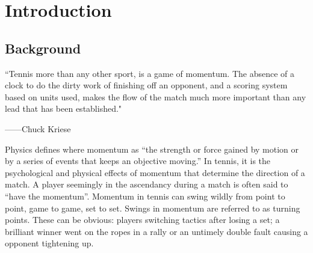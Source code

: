 \documentclass{mcmthesis}
\begin{document}
\begin{abstract}
     {\bf Finally}, we applied the model to data from other games to test the model's ability to
    generalize. Although the model performed poorly in some cases, this prompted us to identify and
    suggest additional factors that may need to be included in future models, such as the {\bf physical
    condition of the players, weather conditions}, as well as {\bf psychological stress}. \par
    Through this study, we have provided coaches and players with data-based insights to better
    understand and apply momentum shifts in matches, providing them with strategic advice going
    into new matches. The results of our study are not only applicable in tennis, but also informative
    for other sports that require an understanding of dynamic competitive states.
\begin{keywords}
    Momentum Analysis; Predictive Modeling; Random Forest; Sliding Window; Logistic Regression;
    Data Visualization; Generalization Capability
\end{keywords}
\end{abstract}


\maketitle

\tableofcontents
\thispagestyle{empty}

\newpage
\section{Introduction}

\subsection{Background}%
“Tennis more than any other sport, is a game of momentum. The absence of a clock to do the dirty
work of finishing off an opponent, and a scoring system based on units used, makes the flow of the
match much more important than any lead that has been established."

\hfill——Chuck Kriese

Physics defines where momentum as “the strength or force gained by motion or by a series of events that keeps an objective moving.” \cite{1} In tennis, it is the psychological and physical effects
of momentum that determine the direction of a match. A player seemingly in the ascendancy
during a match is often said to “have the momentum”. Momentum in tennis can swing wildly from
point to point, game to game, set to set. Swings in momentum are referred to as turning points. These can be obvious: players switching tactics after losing a set; a brilliant winner went on the
ropes in a rally or an untimely double fault causing a opponent tightening up.
\end{document}
